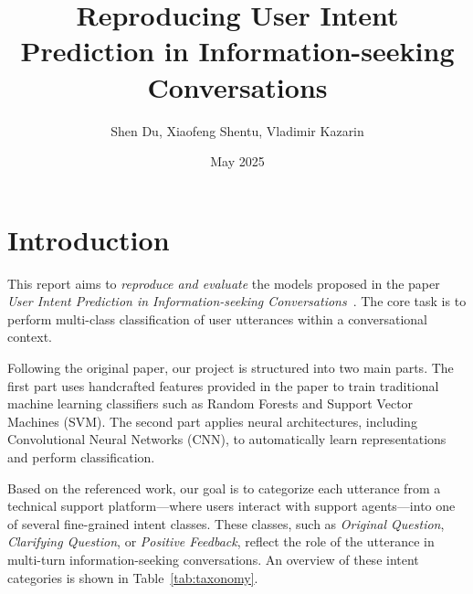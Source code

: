 \documentclass{article}
\title{Reproducing User Intent Prediction in
Information-seeking Conversations}
\author{Shen Du, Xiaofeng Shentu, Vladimir Kazarin}
\date{May 2025}
\begin{document}
\maketitle

\section{Introduction}

This report aims to \textit{reproduce and evaluate} the models proposed in the paper \textit{User Intent Prediction in Information-seeking Conversations}~\cite{qu2019user}. The core task is to perform multi-class classification of user utterances within a conversational context.

Following the original paper, our project is structured into two main parts. The first part uses handcrafted features provided in the paper to train traditional machine learning classifiers such as Random Forests and Support Vector Machines (SVM). The second part applies neural architectures, including Convolutional Neural Networks (CNN), to automatically learn representations and perform classification.

Based on the referenced work, our goal is to categorize each utterance from a technical support platform—where users interact with support agents—into one of several fine-grained intent classes. These classes, such as \textit{Original Question}, \textit{Clarifying Question}, or \textit{Positive Feedback}, reflect the role of the utterance in multi-turn information-seeking conversations. An overview of these intent categories is shown in Table~\ref{tab:taxonomy}.
\end{document}
